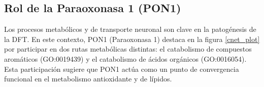 \subsection{Rol de la Paraoxonasa 1 (PON1)}

Los procesos metabólicos y de transporte neuronal son clave en la patogénesis de la DFT. En este contexto, PON1 (Paraoxonasa 1) destaca en la figura \ref{cnet_plot} por participar en dos rutas metabólicas distintas: el catabolismo de compuestos aromáticos (GO:0019439) y el catabolismo de ácidos orgánicos (GO:0016054). Esta participación sugiere que PON1 actúa como un punto de convergencia funcional en el metabolismo antioxidante y de lípidos.